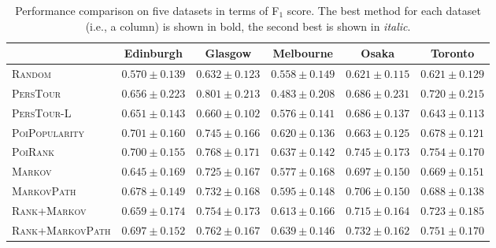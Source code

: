 \begin{table*}[t]
\caption{Performance comparison on five datasets in terms of F$_1$ score. 
        The best method for each dataset (i.e., a column) is shown in bold, the second best is shown in {\em italic}.}
\label{tab:f1}
\centering
\setlength{\tabcolsep}{10pt} %
\begin{tabular}{l|ccccc} \hline
 & Edinburgh & Glasgow & Melbourne & Osaka & Toronto \\ \hline
\textsc{Random} & $0.570\pm0.139$ & $0.632\pm0.123$ & $0.558\pm0.149$ & $0.621\pm0.115$ & $0.621\pm0.129$ \\
\textsc{PersTour}\cite{ijcai15} & $0.656\pm0.223$ & $\mathbf{0.801\pm0.213}$ & $0.483\pm0.208$ & $0.686\pm0.231$ & $0.720\pm0.215$ \\
\textsc{PersTour-L} & $0.651\pm0.143$ & $0.660\pm0.102$ & $0.576\pm0.141$ & $0.686\pm0.137$ & $0.643\pm0.113$ \\
\textsc{PoiPopularity} & $\mathbf{0.701\pm0.160}$ & $0.745\pm0.166$ & $0.620\pm0.136$ & $0.663\pm0.125$ & $0.678\pm0.121$ \\
\textsc{PoiRank} & $\mathit{0.700\pm0.155}$ & $\mathit{0.768\pm0.171}$ & $\mathit{0.637\pm0.142}$ & $\mathbf{0.745\pm0.173}$ & $\mathbf{0.754\pm0.170}$ \\
\textsc{Markov} & $0.645\pm0.169$ & $0.725\pm0.167$ & $0.577\pm0.168$ & $0.697\pm0.150$ & $0.669\pm0.151$ \\
\textsc{MarkovPath} & $0.678\pm0.149$ & $0.732\pm0.168$ & $0.595\pm0.148$ & $0.706\pm0.150$ & $0.688\pm0.138$ \\
\textsc{Rank+Markov} & $0.659\pm0.174$ & $0.754\pm0.173$ & $0.613\pm0.166$ & $0.715\pm0.164$ & $0.723\pm0.185$ \\
\textsc{Rank+MarkovPath} & $0.697\pm0.152$ & $0.762\pm0.167$ & $\mathbf{0.639\pm0.146}$ & $\mathit{0.732\pm0.162}$ & $\mathit{0.751\pm0.170}$ \\
\hline
\end{tabular}
\vspace{-1.2em}
\end{table*}

